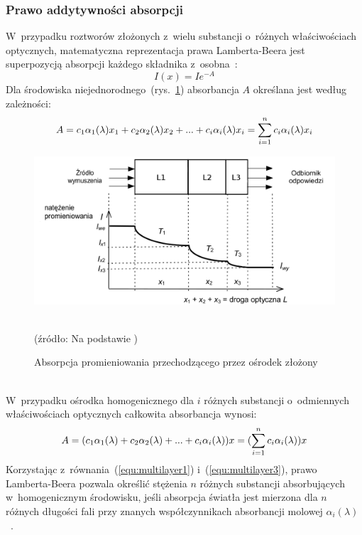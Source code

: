 \subsubsection{Prawo addytywności absorpcji}
\label{subsub:add}

W~przypadku roztworów złożonych z~wielu substancji o~różnych właściwościach optycznych, matematyczna reprezentacja prawa Lamberta-Beera jest superpozycją 
absorpcji każdego składnika z~osobna~\cite{Yavari:PhD:2006}:  
\begin{equation}
	I(x) = Ie^{-A}
	\label{equ:multilayer1}
\end{equation}
Dla środowiska niejednorodnego~(rys.~\ref{rys:multilayer}) absorbancja $A$ określana jest według zależności:
\begin{equation}
	A=c_{1}\alpha_{1}(\lambda)x_{1} + c_{2}\alpha_{2}(\lambda)x_{2} + ... + c_{i}\alpha_{i}(\lambda)x_{i} = \sum_{i=1}^{n}c_{i}\alpha_{i}(\lambda)x_{i}\\
	\label{equ:multilayer2}
\end{equation}
\begin{figure}[!ht]
	\centerline{\includegraphics[scale = 0.40]{graphic/multilayer.png}}
	\caption{Absorpcja promieniowania przechodzącego przez ośrodek złożony}
	~\\
	(źródło: Na podstawie \cite{Cys:2007})
	\label{rys:multilayer}
\end{figure}\\

\noindent W~przypadku ośrodka homogenicznego dla $i$ różnych substancji o~odmiennych właściwościach optycznych całkowita absorbancja wynosi:
\begin{equation}
	A=(c_{1}\alpha_{1}(\lambda) + c_{2}\alpha_{2}(\lambda) + ... + c_{i}\alpha_{i}(\lambda))x = (\sum_{i=1}^{n}c_{i}\alpha_{i}(\lambda))x\\
	\label{equ:multilayer3}
\end{equation}
Korzystając z~równania~(\ref{equ:multilayer1}) i~(\ref{equ:multilayer3}), prawo Lamberta-Beera pozwala określić stężenia $n$ różnych substancji absorbujących 
w~homogenicznym środowisku, jeśli absorpcja światła jest mierzona dla $n$ różnych długości fali przy znanych współczynnikach absorbancji molowej 
$\alpha_{i}(\lambda)$~\cite{Katja:2011}.

